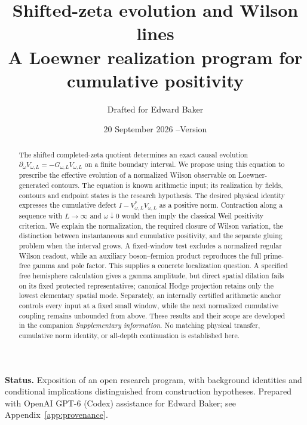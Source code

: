 \documentclass[11pt]{article}
\title{Shifted-zeta evolution and Wilson lines\\[3pt]
\large A Loewner realization program for cumulative positivity}
\author{Drafted for Edward Baker}
\date{20 September 2026 \quad--\quad Version \draftversion}
\begin{document}
\maketitle
\begin{abstract}
The shifted completed-zeta quotient determines an exact causal evolution
$\partial_\omega V_{\omega,L}=-G_{\omega,L}V_{\omega,L}$ on a finite
boundary interval. We propose using this equation to prescribe the
effective evolution of a normalized Wilson observable on
Loewner-generated contours. The equation is known arithmetic input;
its realization by fields, contours and endpoint states is the research
hypothesis. The desired physical identity expresses the cumulative
defect $I-V_{\omega,L}^*V_{\omega,L}$ as a positive norm. Contraction
along a sequence with $L\to\infty$ and $\omega\downarrow0$ would then
imply the classical Weil positivity criterion. We explain the
normalization, the required closure of Wilson variation, the distinction
between instantaneous and cumulative positivity, and the separate
gluing problem when the interval grows. A fixed-window test excludes a normalized regular Wilson readout,
while an auxiliary boson--fermion product reproduces the full
prime-free gamma and pole factor. This supplies a concrete
localization question. A specified free hemisphere calculation gives a
gamma amplitude, but direct spatial dilation fails on its fixed protected
representatives; canonical Hodge projection retains only the lowest
elementary spatial mode. Separately, an internally certified arithmetic
anchor controls every input at a fixed small window, while the next
normalized cumulative coupling remains unbounded from above.
These results and their scope are developed in the companion
\emph{Supplementary information}. No matching physical transfer,
cumulative norm identity, or all-depth continuation is established here.
\end{abstract}
\noindent\textbf{Status.} Exposition of an open research program, with
background identities and conditional implications distinguished from
construction hypotheses. Prepared with OpenAI GPT-6 (Codex) assistance
for Edward Baker; see Appendix~\ref{app:provenance}.
\tableofcontents









\appendix


\end{document}
